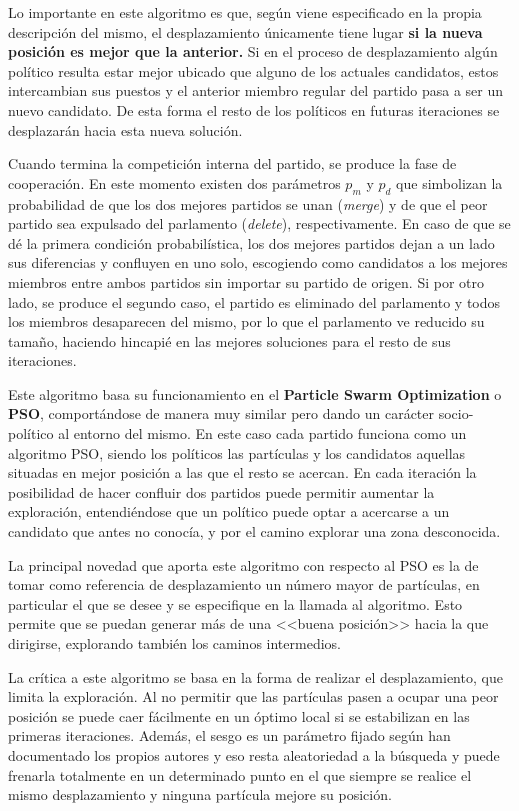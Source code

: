 Lo importante en este algoritmo es que, según viene especificado en la propia descripción del mismo, el desplazamiento únicamente tiene lugar \textbf{si la nueva posición es mejor que la anterior.} Si en el proceso de desplazamiento algún político resulta estar mejor ubicado que alguno de los actuales candidatos, estos intercambian sus puestos y el anterior miembro regular del partido pasa a ser un nuevo candidato. De esta forma el resto de los políticos en futuras iteraciones se desplazarán hacia esta nueva solución.

Cuando termina la competición interna del partido, se produce la fase de cooperación. En este momento existen dos parámetros $p_m$ y $p_d$ que simbolizan la probabilidad de que los dos mejores partidos se unan (\textit{merge}) y de que el peor partido sea expulsado del parlamento (\textit{delete}), respectivamente. En caso de que se dé la primera condición probabilística, los dos mejores partidos dejan a un lado sus diferencias y confluyen en uno solo, escogiendo como candidatos a los mejores miembros entre ambos partidos sin importar su partido de origen. Si por otro lado, se produce el segundo caso, el partido es eliminado del parlamento y todos los miembros desaparecen del mismo, por lo que el parlamento ve reducido su tamaño, haciendo hincapié en las mejores soluciones para el resto de sus iteraciones.

Este algoritmo basa su funcionamiento en el \textbf{Particle Swarm Optimization} o \textbf{PSO}, comportándose de manera muy similar pero dando un carácter socio-político al entorno del mismo. En este caso cada partido funciona como un algoritmo PSO, siendo los políticos las partículas y los candidatos aquellas situadas en mejor posición a las que el resto se acercan. En cada iteración la posibilidad de hacer confluir dos partidos puede permitir aumentar la exploración, entendiéndose que un político puede optar a acercarse a un candidato que antes no conocía, y por el camino explorar una zona desconocida.

La principal novedad que aporta este algoritmo con respecto al PSO es la de tomar como referencia de desplazamiento un número mayor de partículas, en particular el que se desee y se especifique en la llamada al algoritmo. Esto permite que se puedan generar más de una <<buena posición>> hacia la que dirigirse, explorando también los caminos intermedios.

La crítica a este algoritmo se basa en la forma de realizar el desplazamiento, que limita la exploración. Al no permitir que las partículas pasen a ocupar una peor posición se puede caer fácilmente en un óptimo local si se estabilizan en las primeras iteraciones. Además, el sesgo es un parámetro fijado según han documentado los propios autores \cite{poa-article} y eso resta aleatoriedad a la búsqueda y puede frenarla totalmente en un determinado punto en el que siempre se realice el mismo desplazamiento y ninguna partícula mejore su posición.